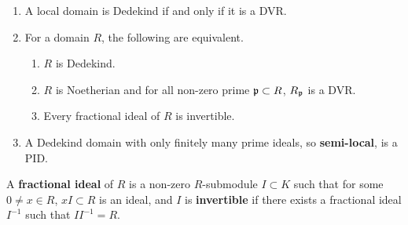 \begin{theorem}
\label{thm:2.1}
\hfill
\begin{enumerate}
\item A local domain is Dedekind if and only if it is a DVR.
\item For a domain $ R $, the following are equivalent.
\begin{enumerate}
\item $ R $ is Dedekind.
\item $ R $ is Noetherian and for all non-zero prime $ \mathfrak{p} \subset R $, $ R_{\mathfrak{p}} $ is a DVR.
\item Every fractional ideal of $ R $ is invertible.
\end{enumerate}
\item A Dedekind domain with only finitely many prime ideals, so \textbf{semi-local}, is a PID.
\end{enumerate}
\end{theorem}

A \textbf{fractional ideal} of $ R $ is a non-zero $ R $-submodule $ I \subset K $ such that for some $ 0 \ne x \in R $, $ xI \subset R $ is an ideal, and $ I $ is \textbf{invertible} if there exists a fractional ideal $ I^{-1} $ such that $ II^{-1} = R $.

